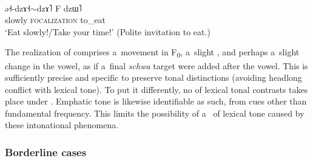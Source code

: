 
\begin{exe}
	\ex
	\label{ex:invitationtoeat}
	\\ 
	\gll ə˧-dzɤ˧${\sim}$dzɤ˥		F			 	dzɯ˥\\
	slowly		\textsc{focalization}		to\_eat\\
	\glt ‘Eat slowly!/Take your time!’ (Polite invitation to eat.)
\end{exe}

The realization of  comprises a~movement in F\textsubscript{0}, a~slight , and perhaps a~slight change in the vowel, as if a~final \textit{schwa} target were added after the vowel. This is sufficiently precise and specific to preserve tonal distinctions (avoiding headlong conflict with lexical tone). To put it differently, no  of lexical tonal contrasts takes place under . Emphatic tone is likewise
identifiable as such, from cues other than fundamental frequency. This limits the
possibility of a~ of lexical tone caused by these intonational phenomena.


\subsubsection{Borderline cases}
\label{sec:borderlinecasesopeningintoadiscussionofthecategoricalstatusofthephenomenon}

